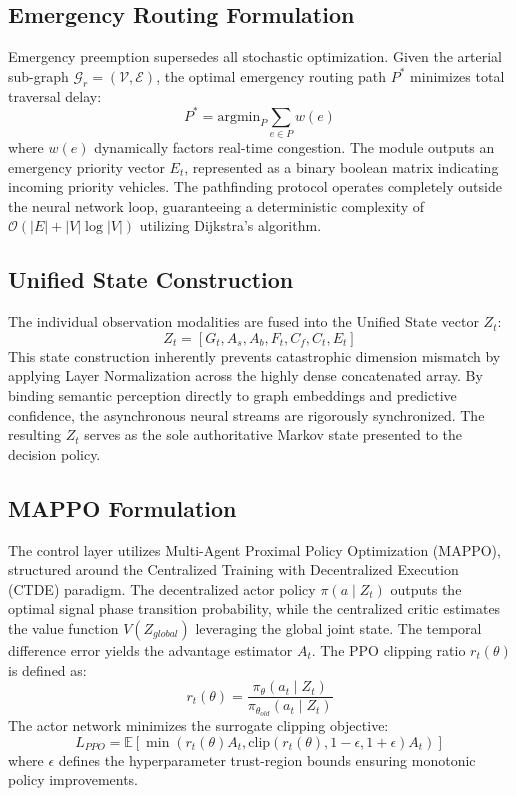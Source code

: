 \subsection{Emergency Routing Formulation}
Emergency preemption supersedes all stochastic optimization. Given the arterial sub-graph $\mathcal{G}_r = (\mathcal{V}, \mathcal{E})$, the optimal emergency routing path $P^*$ minimizes total traversal delay:
\begin{equation}
P^* = \text{argmin}_{P} \sum_{e \in P} w(e)
\end{equation}
where $w(e)$ dynamically factors real-time congestion. The module outputs an emergency priority vector $E_t$, represented as a binary boolean matrix indicating incoming priority vehicles. The pathfinding protocol operates completely outside the neural network loop, guaranteeing a deterministic complexity of $\mathcal{O}(|E| + |V| \log |V|)$ utilizing Dijkstra's algorithm.

\subsection{Unified State Construction}
The individual observation modalities are fused into the Unified State vector $Z_t$:
\begin{equation}
Z_t = [G_t, A_s, A_b, F_t, C_f, C_t, E_t]
\end{equation}
This state construction inherently prevents catastrophic dimension mismatch by applying Layer Normalization across the highly dense concatenated array. By binding semantic perception directly to graph embeddings and predictive confidence, the asynchronous neural streams are rigorously synchronized. The resulting $Z_t$ serves as the sole authoritative Markov state presented to the decision policy.

\subsection{MAPPO Formulation}
The control layer utilizes Multi-Agent Proximal Policy Optimization (MAPPO), structured around the Centralized Training with Decentralized Execution (CTDE) paradigm. The decentralized actor policy $\pi(a \mid Z_t)$ outputs the optimal signal phase transition probability, while the centralized critic estimates the value function $V(Z_{global})$ leveraging the global joint state. The temporal difference error yields the advantage estimator $A_t$. The PPO clipping ratio $r_t(\theta)$ is defined as:
\begin{equation}
r_t(\theta) = \frac{\pi_\theta(a_t \mid Z_t)}{\pi_{\theta_{old}}(a_t \mid Z_t)}
\end{equation}
The actor network minimizes the surrogate clipping objective:
\begin{equation}
L_{PPO} = \mathbb{E} \left[ \min(r_t(\theta) A_t, \text{clip}(r_t(\theta), 1-\epsilon, 1+\epsilon) A_t) \right]
\end{equation}
where $\epsilon$ defines the hyperparameter trust-region bounds ensuring monotonic policy improvements.

